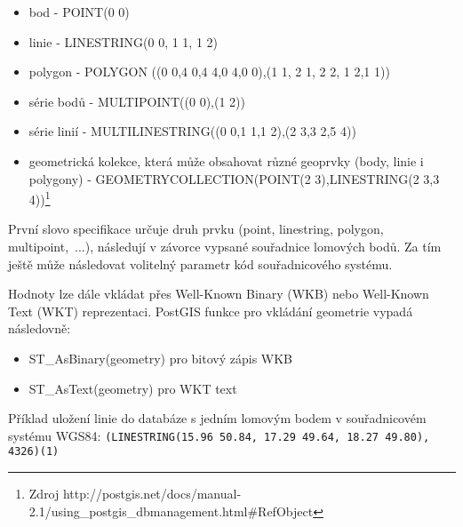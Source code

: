         \begin{itemize}
          \item bod - POINT(0 0)
          \item linie - LINESTRING(0 0, 1 1, 1 2)
          \item polygon - POLYGON ((0 0,4 0,4 4,0 4,0 0),(1 1, 2 1, 2 2, 1 2,1 1))
          \item série bodů - MULTIPOINT((0 0),(1 2))
          \item série linií - MULTILINESTRING((0 0,1 1,1 2),(2 3,3 2,5 4))
          \item geometrická kolekce, která může obsahovat různé geoprvky (body, linie i polygony) - GEOMETRYCOLLECTION(POINT(2 3),LINESTRING(2 3,3 4))\footnote{Zdroj http://postgis.net/docs/manual-2.1/using\_postgis\_dbmanagement.html\#RefObject}
        \end{itemize}

        První slovo specifikace určuje druh prvku (point, linestring, polygon, multipoint,~...), následují v závorce vypsané souřadnice lomových bodů. Za tím ještě může následovat volitelný parametr kód souřadnicového systému.

        Hodnoty lze dále vkládat přes Well-Known Binary (WKB) nebo Well-Known Text (WKT) reprezentaci. PostGIS funkce pro vkládání geometrie vypadá následovně:

        \begin{itemize}
          \item ST\_AsBinary(geometry) pro bitový zápis WKB
          \item ST\_AsText(geometry) pro WKT text
        \end{itemize}

        Příklad uložení linie do databáze s jedním lomovým bodem v souřadnicovém systému WGS84:
        \newline \newline
        \texttt{(LINESTRING(15.96 50.84, 17.29 49.64, 18.27 49.80), 4326)\hspace*{4.5em}(1)}
